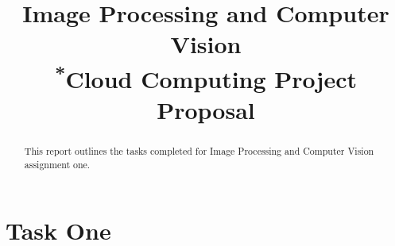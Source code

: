 \documentclass[conference]{IEEEtran}
\begin{document}
\title{Image Processing and Computer Vision\\
{\footnotesize \textsuperscript{*}Cloud Computing Project Proposal}
}

\author{
}

\maketitle

\begin{abstract}
This report outlines the tasks completed for Image Processing and Computer Vision assignment one.
\end{abstract}

\section{Task One}
\end{document}
